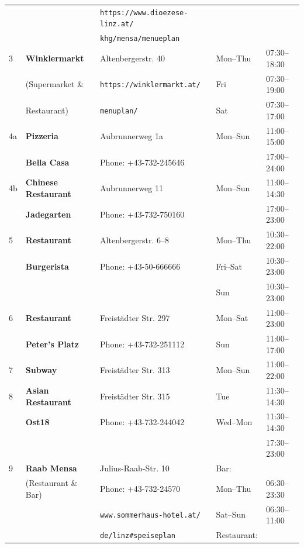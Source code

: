 \begin{center}
\begin{footnotesize}
\begin{longtable}{|| l || l | l | l l||}
     &                    & \texttt{https://www.dioezese-linz.at/} & & \\
     &                    &  \texttt{khg/mensa/menueplan}  & & \\ \hline
  3  & \textbf{Winklermarkt} &  Altenbergerstr. 40 & Mon--Thu & 07:30--18:30 \\
     & (Supermarket \& &  \texttt{https://winklermarkt.at/}  & Fri & 07:30--19:00 \\
     & Restaurant) &  \texttt{menuplan/}  & Sat & 07:30--17:00 \\ \hline
  4a  & \textbf{Pizzeria} & Aubrunnerweg 1a & Mon--Sun & 11:00--15:00 \\
     & \textbf{Bella Casa} & Phone: +43-732-245646 &          & 17:00--24:00 \\ \hline
  4b  & \textbf{Chinese Restaurant} & Aubrunnerweg 11 & Mon--Sun & 11:00--14:30 \\
     & \textbf{Jadegarten} & Phone: +43-732-750160 &          & 17:00--23:00 \\ \hline
  5  & \textbf{Restaurant} & Altenbergerstr. 6--8 & Mon--Thu & 10:30--22:00 \\
     & \textbf{Burgerista} &  Phone: +43-50-666666 &  Fri--Sat & 10:30--23:00 \\ 
     &  &                     &  Sun & 10:30--23:00 \\ \hline
  6  & \textbf{Restaurant} & Freist\"{a}dter Str. 297 & Mon--Sat & 11:00--23:00 \\
     & \textbf{Peter's Platz} &  Phone: +43-732-251112                   &  Sun & 11:00--17:00 \\ \hline
  7 & \textbf{Subway} & Freist\"{a}dter Str. 313 & Mon--Sun & 11:00--22:00 \\ \hline
  8  & \textbf{Asian Restaurant} & Freist\"{a}dter Str. 315 & Tue & 11:30--14:30 \\
     & \textbf{Ost18} &  Phone: +43-732-244042              &  Wed--Mon & 11:30--14:30 \\ 
     &  &   &   & 17:30--23:00 \\ \hline
  9  & \textbf{Raab Mensa} & Julius-Raab-Str. 10 & Bar: & \\
     & (Restaurant \& Bar)   & Phone: +43-732-24570 & Mon--Thu & 06:30--23:30\\
     &             & \texttt{www.sommerhaus-hotel.at/} & Sat--Sun & 06:30--11:00 \\
     &                            & \texttt{de/linz\#{}speiseplan} & Restaurant:& \\

\end{longtable}
\end{footnotesize}
\end{center}
